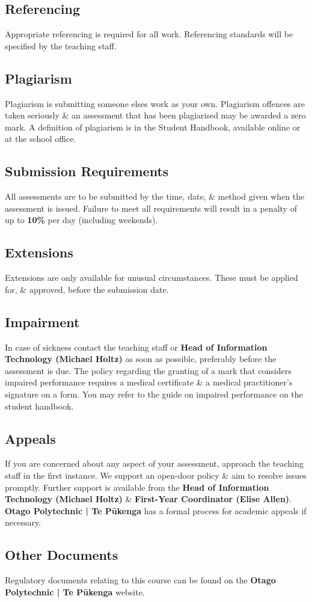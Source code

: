 \documentclass{article}
\begin{document}
\subsection*{Referencing}
Appropriate referencing is required for all work. Referencing standards will be specified by the teaching staff.

\subsection*{Plagiarism}
Plagiarism is submitting someone elses work as your own. Plagiarism offences are taken seriously \& an assessment that has been plagiarised may be awarded a zero mark. A definition of plagiarism is in the Student Handbook, available online or at the school office.

\subsection*{Submission Requirements}
All assessments are to be submitted by the time, date, \& method given when the assessment is issued. Failure to meet all requirements will result in a penalty of up to \textbf{10\%} per day (including weekends).

\subsection*{Extensions}
Extensions are only available for unusual circumstances. These must be applied for, \& approved, before the submission date.

\subsection*{Impairment}
In case of sickness contact the teaching staff or \textbf{Head of Information Technology (Michael Holtz)} as soon as possible, preferably before the assessment is due. The policy regarding the granting of a mark that considers impaired performance requires a medical certificate \& a medical practitioner’s signature on a form. You may refer to the guide on impaired performance on the student handbook.

\subsection*{Appeals}
If you are concerned about any aspect of your assessment, approach the teaching staff in the first instance. We support an open-door policy \& aim to resolve issues promptly. Further support is available from the \textbf{Head of Information Technology (Michael Holtz)} \& \textbf{First-Year Coordinator (Elise Allen)}. \textbf{Otago Polytechnic | Te Pūkenga} has a formal process for academic appeals if necessary.

\subsection*{Other Documents}
Regulatory documents relating to this course can be found on the \textbf{Otago Polytechnic | Te Pūkenga} website.
\end{document}
